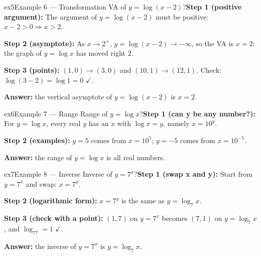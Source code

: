 \documentclass[11pt]{article}
\begin{document}
\begin{example}{ex5}{Example 6 --- Transformation}
VA of $y=\log(x-2)$?\soln \textbf{Step 1 (positive argument):} The argument of $y=\log(x-2)$ must be positive: $x-2>0\Rightarrow x>2$.

\textbf{Step 2 (asymptote):} As $x\to2^+$, $y=\log(x-2)\to-\infty$, so the VA is $x=2$: the graph of $y=\log x$ has moved right $2$.

\textbf{Step 3 (points):} $(1,0)\to(3,0)$ and $(10,1)\to(12,1)$. Check: $\log(3-2)=\log1=0$ $\checkmark$.

\textbf{Answer:} the vertical asymptote of $y=\log(x-2)$ is $x=2$.

\end{example}

\begin{example}{ex6}{Example 7 --- Range}
Range of $y=\log x$?\soln \textbf{Step 1 (can y be any number?):} For $y=\log x$, every real $y$ has an $x$ with $\log x=y$, namely $x=10^y$.

\textbf{Step 2 (examples):} $y=5$ comes from $x=10^5$; $y=-5$ comes from $x=10^{-5}$.

\textbf{Answer:} the range of $y=\log x$ is all real numbers.
\end{example}

\begin{example}{ex7}{Example 8 --- Inverse}
Inverse of $y=7^x$?\soln \textbf{Step 1 (swap x and y):} Start from $y=7^x$ and swap: $x=7^y$.

\textbf{Step 2 (logarithmic form):} $x=7^y$ is the same as $y=\log_7x$.

\textbf{Step 3 (check with a point):} $(1,7)$ on $y=7^x$ becomes $(7,1)$ on $y=\log_7x$, and $\log_77=1$ $\checkmark$.

\textbf{Answer:} the inverse of $y=7^x$ is $y=\log_7x$.
\end{example}
\end{document}
